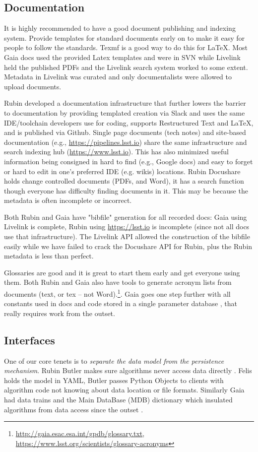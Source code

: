 \documentclass[11pt,twoside]{article}
\begin{document}
\subsection{Documentation}
It is highly recommended to have  a good document publishing and indexing system.
Provide templates for standard documents early on to make it easy for people to follow the standards. Texmf is a good way to do this for \LaTeX.
Most Gaia docs used the provided Latex templates and were in SVN while Livelink held the published PDFs and the Livelink search system worked to some extent.
Metadata in Livelink was curated and only documentalists  were allowed to upload documents.

Rubin developed a documentation infrastructure that further lowers the barrier to documentation by providing templated creation via Slack and uses the same IDE/toolchain developers use for coding, supports Restructured Text and \LaTeX, and is published via Github.
Single page documents (tech notes) and site-based documentation (e.g., \url{https://pipelines.lsst.io}) share the same infrastructure \citep{SQR-000} and search indexing hub (\url{https://www.lsst.io}).
This has also minimized useful information being consigned in hard to find (e.g., Google docs) and easy to forget or hard to edit in one's preferred IDE (e.g. wikis) locations.
Rubin Docushare holds change controlled documents (PDFs, and Word), it has a search function though everyone has difficulty finding documents in it.
This may be because the metadata is often incomplete or incorrect.

Both Rubin and Gaia have "bibfile" generation for all recorded docs: Gaia using Livelink is complete, Rubin using \url{https://lsst.io} is incomplete (since not all docs use that infrastructure).
The Livelink API allowed the construction of the bibfile easily while we have failed to crack the Docushare API for Rubin, plus the Rubin metadata is less than perfect.

Glossaries are good and it is great to start them early and get everyone using them.
Both Rubin and Gaia also have tools to generate acronym lists from documents (text, or tex -- not Word).\footnote{\url{http://gaia.esac.esa.int/gpdb/glossary.txt}, \url{https://www.lsst.org/scientists/glossary-acronyms}}.  Gaia goes one step further with all constants used in docs and code stored in a single parameter database \citep{2005ESASP.576...67D}, that really requires work from the outset.


\subsection{Interfaces}
One of our core tenets is to \emph{separate the data model from the persistence mechanism}.
Rubin Butler makes sure algorithms never access data directly \citep{2022SPIE12189E..11J,2019ASPC..523..653J,C24_adassxxxii,P52_adassxxxii}.
Felis holds the model in YAML, Butler passes Python Objects to clients with algorithm code not knowing about data location or file formats.
Similarly Gaia had data trains and the Main DataBase (MDB) dictionary which insulated algorithms from data access since the outset \citep{1999BaltA...8...57O}.
\end{document}
